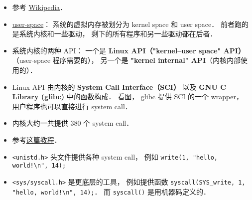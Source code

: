 
\begin{issues}
\issueDraft
\end{issues}

\begin{itemize}
\item 参考 \href{https://en.wikipedia.org/wiki/Linux_kernel_interfaces}{Wikipedia}．
\item \href{https://en.wikipedia.org/wiki/User_space_and_kernel_space}{user-space}： 系统的虚拟内存被划分为 kernel space 和 user space． 前者跑的是系统内核和一些驱动， 剩下的所有程序和另一些驱动都在后者．
\item 系统内核的两种 API： 一个是 \textbf{Linux API（"kernel–user space" API）}（user-space 程序需要的）， 另一个是 \textbf{"kernel internal" API}（内核内部使用的）．
\item Linux API 由内核的 \textbf{System Call Interface（SCI）} 以及 \textbf{GNU C Library (glibc)} 中的函数构成． 看图， glibc 提供 SCI 的一个 wrapper， 用户程序也可以直接进行 system call．
\item 内核大约一共提供 380 个 system call．
\item 参考\href{https://jameshfisher.com/2018/02/19/how-to-syscall-in-c/}{这篇教程}．
\item \verb|<unistd.h>| 头文件提供各种 system call， 例如 \verb|write(1, "hello, world!\n", 14);|
\item \verb|<sys/syscall.h>| 是更底层的工具， 例如提供函数 \verb|syscall(SYS_write, 1, "hello, world!\n", 14);|． 而 \verb|syscall()| 是用机器码定义的．
\end{itemize}
